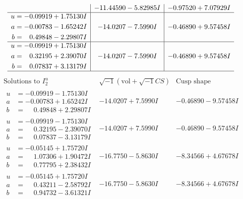 \documentclass[1p]{elsarticle_modified}
\theoremstyle{definition}
\newcommand{\I}{\sqrt{-1}}
\begin{document}
$$\begin{array}{c|c|c}
 & -11.44590 - 5.82985 I & -0.97520 + 7.07929 I \\ \hline\begin{aligned}
u &= -0.09919 + 1.75130 I \\
a &= -0.00783 - 1.65242 I \\
b &= \phantom{-}0.49848 - 2.29807 I\end{aligned}
 & -14.0207 - 7.5990 I & -0.46890 + 9.57458 I \\ \hline\begin{aligned}
u &= -0.09919 + 1.75130 I \\
a &= \phantom{-}0.32195 + 2.39070 I \\
b &= \phantom{-}0.07837 + 3.13179 I\end{aligned}
 & -14.0207 - 7.5990 I & -0.46890 + 9.57458 I\\
 \hline 
 \end{array}$$\newpage$$\begin{array}{c|c|c}  
\text{Solutions to }I^u_{2}& \I (\text{vol} + \sqrt{-1}CS) & \text{Cusp shape}\\
 \hline 
\begin{aligned}
u &= -0.09919 - 1.75130 I \\
a &= -0.00783 + 1.65242 I \\
b &= \phantom{-}0.49848 + 2.29807 I\end{aligned}
 & -14.0207 + 7.5990 I & -0.46890 - 9.57458 I \\ \hline\begin{aligned}
u &= -0.09919 - 1.75130 I \\
a &= \phantom{-}0.32195 - 2.39070 I \\
b &= \phantom{-}0.07837 - 3.13179 I\end{aligned}
 & -14.0207 + 7.5990 I & -0.46890 - 9.57458 I \\ \hline\begin{aligned}
u &= -0.05145 + 1.75720 I \\
a &= \phantom{-}1.07306 + 1.90472 I \\
b &= \phantom{-}0.77795 + 2.38432 I\end{aligned}
 & -16.7750 - 5.8630 I & -8.34566 + 4.67678 I \\ \hline\begin{aligned}
u &= -0.05145 + 1.75720 I \\
a &= \phantom{-}0.43211 - 2.58792 I \\
b &= \phantom{-}0.94732 - 3.61321 I\end{aligned}
 & -16.7750 - 5.8630 I & -8.34566 + 4.67678 I \\ \hline\begin{aligned}

\end{aligned}
\end{array}$$
\end{document}

